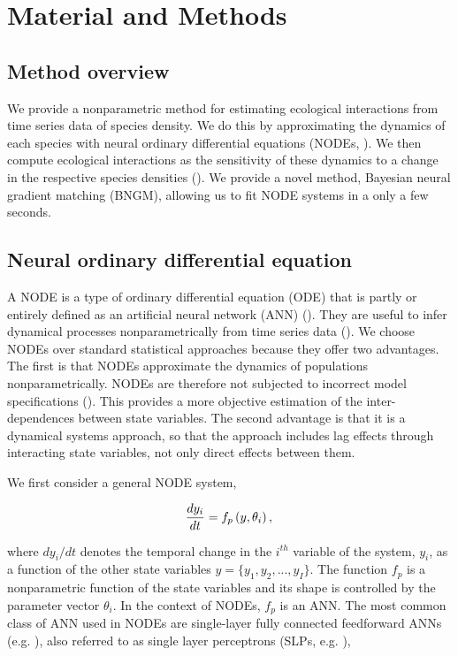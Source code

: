 \documentclass[11pt, oneside]{article}
\begin{document}
\section{Material and Methods}

\subsection{Method overview}

We provide a nonparametric method for estimating ecological interactions from time series data of species density. 
We do this by approximating the dynamics of each species with neural ordinary differential equations (NODEs, \cite{Bonnaffe2021a}). 
We then compute ecological interactions as the sensitivity of these dynamics to a change in the respective species densities (\cite{Sugihara2012,Bonnaffe2021a}).
We provide a novel method, Bayesian neural gradient matching (BNGM), allowing us to fit NODE systems in a only a few seconds.

\subsection{Neural ordinary differential equation}

A NODE is a type of ordinary differential equation (ODE) that is partly or entirely defined as an artificial neural network (ANN) (\cite{Chen2018}).
They are useful to infer dynamical processes nonparametrically from time series data (\cite{Bonnaffe2021a}).
We choose NODEs over standard statistical approaches because they offer two advantages. 
The first is that NODEs approximate the dynamics of populations nonparametrically.
NODEs are therefore not subjected to incorrect model specifications (\cite{Jost2000,Adamson2013}).
This provides a more objective estimation of the inter-dependences between state variables. 
The second advantage is that it is a dynamical systems approach, so that the approach includes lag effects through interacting state variables, not only direct effects between them. 

We first consider a general NODE system,

\vspace{-0.5cm}
\begin{equation}
    \frac{dy_i}{dt} = f_p \left(y,\theta_i \right), \\
\end{equation}

where $dy_i/dt$ denotes the temporal change in the $i^{th}$ variable of the system, $y_i$, as a function of the other state variables $y = \{ y_1, y_2, ..., y_I\}$.
The function $f_p$ is a nonparametric function of the state variables and its shape is controlled by the parameter vector $\theta_i$.
In the context of NODEs, $f_p$ is an ANN.
The most common class of ANN used in NODEs are single-layer fully connected feedforward ANNs (e.g. \cite{Wu2005}), also referred to as single layer perceptrons (SLPs, e.g. \cite{Bonnaffe2021a}), 
\end{document}
